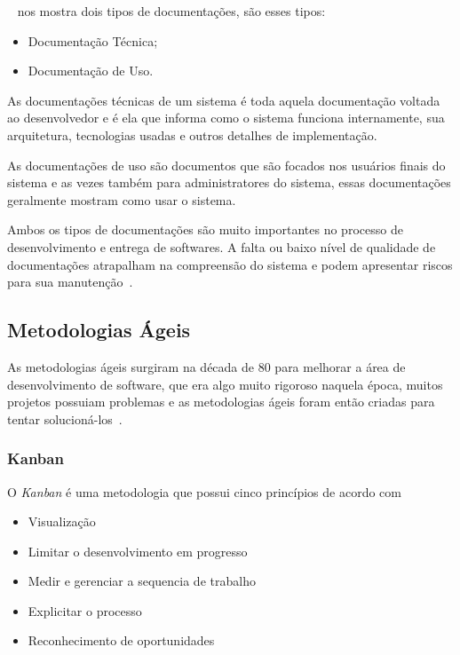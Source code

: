 \documentclass[12pt]{article}
\begin{document}
~\cite{Coelho_2009} nos mostra dois tipos de documentações, são esses tipos:

\begin{itemize}
	\item Documentação Técnica;
	\item Documentação de Uso.
\end{itemize}

As documentações técnicas de um sistema é toda aquela documentação voltada ao desenvolvedor e é
ela que informa como o sistema funciona internamente, sua arquitetura, tecnologias usadas e outros detalhes de implementação.

As documentações de uso são documentos que são focados nos usuários finais do sistema e as vezes também para administratores do sistema,
essas documentações geralmente mostram como usar o sistema.

Ambos os tipos de documentações são muito importantes no processo de desenvolvimento e entrega de softwares. A falta ou
baixo nível de qualidade de documentações atrapalham na compreensão do sistema e podem apresentar
riscos para sua manutenção~\cite{deinvestigaccao}.

\subsection{Metodologias Ágeis}

As metodologias ágeis surgiram na década de 80 para melhorar a área de desenvolvimento de software,
que era algo muito rigoroso naquela época, muitos projetos possuiam problemas e as metodologias ágeis foram então
criadas para tentar solucioná-los~\cite{Santos05}.

\subsubsection{Kanban}

O \textit{Kanban} é uma metodologia que possui cinco princípios de acordo com~\cite{Agile06}
\begin{itemize}
  \item Visualização
  \item Limitar o desenvolvimento em progresso
  \item Medir e gerenciar a sequencia de trabalho
  \item Explicitar o processo
  \item Reconhecimento de oportunidades
\end{itemize}
\end{document}
